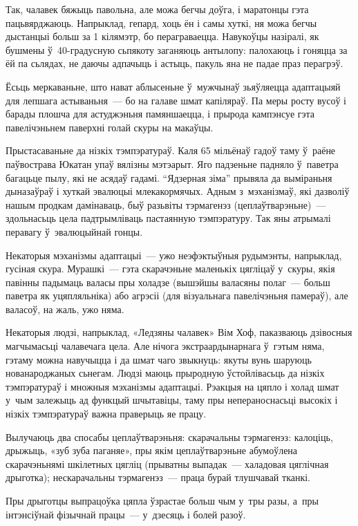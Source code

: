 Так, чалавек бяжыць павольна, але можа бегчы доўга, і маратонцы гэта пацьвярджаюць. Напрыклад, гепард, хоць ён і самы хуткі, ня можа бегчы дыстанцыі больш за 1 кілямэтр, бо пераграваецца. Навукоўцы назіралі, як бушмены ў~40-градусную сьпякоту заганяюць антылопу: палохаюць і гоняцца за ёй па сьлядах, не даючы адпачыць і астыць, пакуль яна не падае праз перагрэў.

Ёсьць меркаваньне, што нават аблысеньне ў~мужчынаў зьяўляецца адаптацыяй для лепшага астываньня~--- бо на галаве шмат капіляраў. Па меры росту вусоў і барады плошча для астуджэньня памяншаецца, і прырода кампэнсуе гэта павелічэньнем паверхні голай скуры на макаўцы.

Прыстасаваньне да нізкіх тэмпэратураў. Каля 65 мільёнаў гадоў таму ў~раёне паўвострава Юкатан упаў вялізны мэтэарыт. Яго падзеньне падняло ў~паветра багацьце пылу, які не асядаў гадамі. ``Ядзерная зіма'' прывяла да выміраньня дыназаўраў і хуткай эвалюцыі млекакормячых. Адным з~мэханізмаў, які дазволіў нашым продкам дамінаваць, быў разьвіты тэрмагенэз (цеплаўтварэньне)~--- здольнасьць цела падтрымліваць пастаянную тэмпэратуру. Так яны атрымалі перавагу ў~эвалюцыйнай гонцы.

Некаторыя мэханізмы адаптацыі~--- ужо неэфэктыўныя рудымэнты, напрыклад, гусіная скура. Мурашкі~--- гэта скарачэньне маленькіх цягліцаў у~скуры, якія павінны падымаць валасы пры холадзе (вышэйшы валасяны полаг~--- больш паветра як уцяпляльніка) або агрэсіі (для візуальнага павелічэньня памераў), але валасоў, на жаль, ужо няма.

Некаторыя людзі, напрыклад, «Ледзяны чалавек» Вім Хоф, паказваюць дзівосныя магчымасьці чалавечага цела. Але нічога экстраардынарнага ў~гэтым няма, гэтаму можна навучыцца і да шмат чаго звыкнуць: якуты вунь шаруюць нованароджаных сьнегам. Людзі маюць прыродную ўстойлівасьць да нізкіх тэмпэратураў і множныя мэханізмы адаптацыі. Рэакцыя на цяпло і холад шмат у~чым залежыць ад функцый шчытавіцы, таму пры непераноснасьці высокіх і нізкіх тэмпэратураў важна праверыць яе працу.

Вылучаюць два спосабы цеплаўтварэньня: скарачальны тэрмагенэз: калоціць, дрыжыць, «зуб зуба паганяе», пры якім цеплаўтварэньне абумоўлена скарачэньнямі шкілетных цягліц (прыватны выпадак~--- халадовая цяглічная дрыготка); нескарачальны тэрмагенэз~--- праца бурай тлушчавай тканкі.

Пры дрыготцы выпрацоўка цяпла ўзрастае больш чым у~тры разы, а~пры інтэнсіўнай фізычнай працы~--- у~дзесяць і болей разоў.

